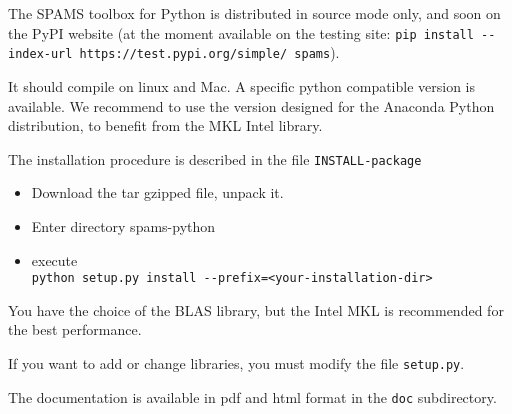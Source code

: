 The SPAMS toolbox for Python is distributed in source mode only, and soon
on the PyPI website (at the moment available on the testing site:
\verb=pip install --index-url https://test.pypi.org/simple/ spams=).

It should compile on linux and Mac. A specific python compatible version
is available. We recommend to use the version designed for the Anaconda
Python distribution, to benefit from the MKL Intel library.

The installation procedure is described in the file \verb=INSTALL-package=
\begin{itemize}
\item Download the tar gzipped file, unpack it.
\item Enter directory spams-python
\item execute \\
  \verb;python setup.py install --prefix=<your-installation-dir>;
\end{itemize}

You have the choice of the BLAS library, but the Intel
MKL is recommended for the best performance.

If you want to add or change libraries, you must modify
the file \verb=setup.py=.

The documentation is available in pdf and html format in the \verb=doc= subdirectory.

